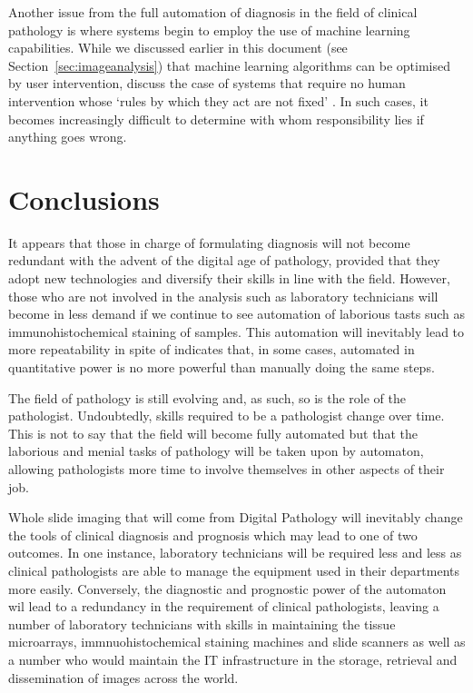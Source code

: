 \documentclass[12pt]{article}
\begin{document}
Another issue from the full automation of diagnosis in the field of clinical pathology is where systems begin to employ 
the use of machine learning capabilities. While we discussed earlier in this document (see 
Section~\ref{sec:imageanalysis}) that machine learning algorithms can be optimised by user intervention, 
\citeauthor{matthias2004responsibility} discuss the case of systems that require no human intervention whose 
`rules by which they act are not fixed' \parencite{matthias2004responsibility}. In such cases, it becomes increasingly
difficult to determine with whom responsibility lies if anything goes wrong.

\section{Conclusions}\label{conclusions}

It appears that those in charge of formulating diagnosis will not become redundant with the advent of the digital age 
of pathology, provided that they adopt new technologies and diversify their skills in line with the field. However, those 
who are not involved in the analysis such as laboratory technicians will become in less demand if we continue to see 
automation of laborious tasts such as immunohistochemical staining of samples. This automation will inevitably lead to 
more repeatability in spite of indicates that, in some cases, automated in quantitative power is no more powerful than 
manually doing the same steps.

The field of pathology is still evolving and, as such, so is the role of the pathologist. Undoubtedly, skills required to be a pathologist 
change over time. This is not to say that the field will become fully automated but that the 
laborious and menial tasks of pathology will be taken upon by automaton, allowing pathologists more time to involve 
themselves in other aspects of their job.

Whole slide imaging that will come from Digital Pathology will inevitably 
change the tools of clinical diagnosis and prognosis which may lead to one of two outcomes. In one instance, 
laboratory technicians will be required less and less as clinical pathologists are able to manage the equipment 
used in their departments more easily. Conversely, the diagnostic and prognostic power of the automaton wil lead to 
a redundancy in the requirement of clinical pathologists, leaving a number of laboratory technicians with skills in 
maintaining the tissue microarrays, immnuohistochemical staining machines and slide scanners as well as a number 
who would maintain the IT infrastructure in the storage, retrieval and dissemination of images across the world.
\end{document}
